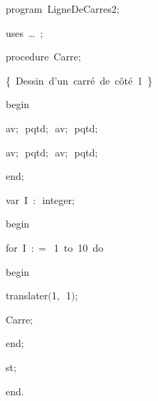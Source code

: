 
{
\parindent {}
\medskip

\carrenoir
\vspace{\neglskip}\mbox{\blc  \idt  \mcl program\idt \ LigneDeCarres2$;$
}\par 
\vspace{\neglskip}\mbox{\blc \blk\idt \mcl uses\idt \ \ldots\ $;$
}\par 
\medskip

\pagebreak[3] 
\vspace{\neglskip}\mbox{\blc  \blk\idt  \mcl procedure\idt \ Carre$;$}\par 
\vspace{\neglskip}\mbox{\blc  \blk\blk\idt  \cmt  \{\ Dessin\ d{'}un\ carré\ de\ côté\ 1\ \}\idt }\par 
\vspace{\neglskip}\mbox{\blc  \blk\idt  \mcl begin\idt }\par 
\vspace{\neglskip}\mbox{\blc  \blk\blk\idt  av$;$\ pqtd$;$\ av$;$\ pqtd$;$}\par 
\vspace{\neglskip}\mbox{\blc  \blk\blk\idt  av$;$\ pqtd$;$\ av$;$\ pqtd$;$\ }\par 
\vspace{\neglskip}\mbox{\blc  \blk\idt  \mcl end\idt $;$}\par 
\medskip

\pagebreak[3] 
\vspace{\neglskip}\mbox{\blc  \blk\idt  \mcl var\idt \ I\ $:$\ integer$;$}\par 
\medskip

\vspace{\neglskip}\mbox{\blc  \idt  \mcl begin\idt }\par 
\pagebreak[3] 
\vspace{\neglskip}\mbox{\blc  \blk\idt  \mcl for\idt \ I\ $:$$=$\ 1\ \mcl to\idt \ 10\ \mcl do\idt }\par 
\vspace{\neglskip}\mbox{\blc  \blk\blk\idt  \mcl begin\idt }\par 
\vspace{\neglskip}\mbox{\blc  \blk\blk\blk\idt  translater$($1$,$\ 1$)$$;$}\par 
\vspace{\neglskip}\mbox{\blc  \blk\blk\blk\idt  Carre$;$}\par 
\vspace{\neglskip}\mbox{\blc  \blk\blk\idt  \mcl end\idt $;$}\par 
\vspace{\neglskip}\mbox{\blc  \blk\idt  st$;$}\par 
\vspace{\neglskip}\mbox{\blc  \idt  \mcl end\idt $.$}\par 

\medskip }

